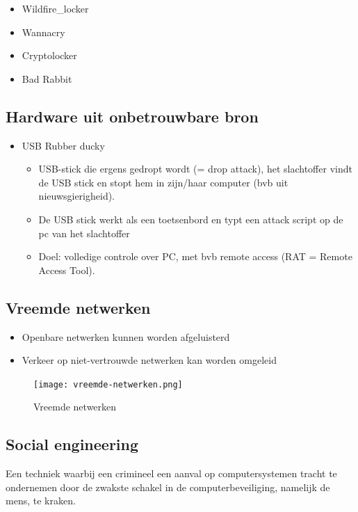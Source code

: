 \documentclass{article}
\begin{document}
\begin{itemize}
    \item Wildfire\_locker
    \item Wannacry
    \item Cryptolocker
    \item Bad Rabbit
\end{itemize}

\subsection{Hardware uit onbetrouwbare bron}
\begin{itemize}
    \item USB Rubber ducky
    \begin{itemize}
        \item USB-stick die ergens gedropt wordt (= drop attack), het slachtoffer vindt de USB stick en stopt hem in zijn/haar computer (bvb uit nieuwsgierigheid).
        \item De USB stick werkt als een toetsenbord en typt een attack script op de pc van het slachtoffer
        \item Doel: volledige controle over PC, met bvb remote access (RAT = Remote Access Tool).
    \end{itemize}
\end{itemize}

\subsection{Vreemde netwerken}
\begin{itemize}
    \item Openbare netwerken kunnen worden afgeluisterd
    \item Verkeer op niet-vertrouwde netwerken kan worden omgeleid
\end{itemize}

\begin{figure}[H]
    \centering
    \texttt{[image: vreemde-netwerken.png]}
    \caption{Vreemde netwerken}
\end{figure}

\subsection{Social engineering}
Een techniek waarbij een crimineel een aanval op computersystemen tracht te ondernemen door de zwakste schakel in de computerbeveiliging, namelijk de mens, te kraken.
\end{document}
